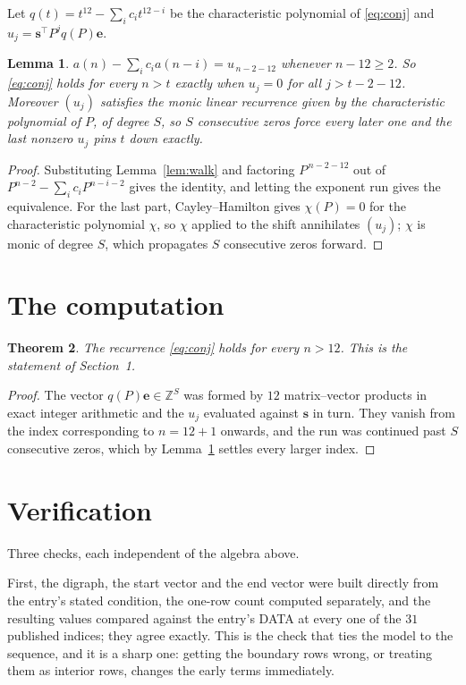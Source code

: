 \documentclass[11pt,a4paper]{article}
\theoremstyle{plain}
\newtheorem{theorem}{Theorem}
\newtheorem{lemma}[theorem]{Lemma}
\theoremstyle{definition}
\begin{document}
Let $q(t)=t^{12}-\sum_i c_i t^{12-i}$ be the characteristic polynomial of
\eqref{eq:conj} and $u_j=\mathbf{s}^{\!\top}P^{j}q(P)\mathbf{e}$.

\begin{lemma}\label{lem:crit}
$a(n)-\sum_i c_i a(n-i)=u_{\,n-2-12}$ whenever $n-12\ge2$. So \eqref{eq:conj}
holds for every $n>t$ exactly when $u_j=0$ for all $j>t-2-12$. Moreover $(u_j)$
satisfies the monic linear recurrence given by the characteristic polynomial of $P$, of
degree $S$, so $S$ consecutive zeros force every later one and the last nonzero $u_j$ pins
$t$ down exactly.
\end{lemma}

\begin{proof}
Substituting Lemma~\ref{lem:walk} and factoring $P^{\,n-2-12}$ out of
$P^{n-2}-\sum_i c_i P^{n-i-2}$ gives the identity, and letting the exponent run gives the
equivalence. For the last part, Cayley--Hamilton gives $\chi(P)=0$ for the characteristic
polynomial $\chi$, so $\chi$ applied to the shift annihilates $(u_j)$; $\chi$ is monic of
degree $S$, which propagates $S$ consecutive zeros forward.
\end{proof}

\section{The computation}

\begin{theorem}
The recurrence \eqref{eq:conj} holds for every $n>12$. This is the statement of
Section~1.
\end{theorem}

\begin{proof}
The vector $q(P)\mathbf{e}\in\mathbb{Z}^{S}$ was formed by $12$ matrix--vector
products in exact integer arithmetic and the $u_j$ evaluated against $\mathbf{s}$ in turn.
They vanish from the index corresponding to $n=12+1$ onwards, and the run was continued
past $S$ consecutive zeros, which by Lemma~\ref{lem:crit} settles every larger index.
\end{proof}

\section{Verification}

Three checks, each independent of the algebra above.

First, the digraph, the start vector and the end vector were built directly from the
entry's stated condition, the one-row count computed separately, and the resulting values
compared against the entry's DATA at every one of the $31$ published indices; they
agree exactly. This is the check that ties the model to the sequence, and it is a sharp one:
getting the boundary rows wrong, or treating them as interior rows, changes the early terms
immediately.
\end{document}
